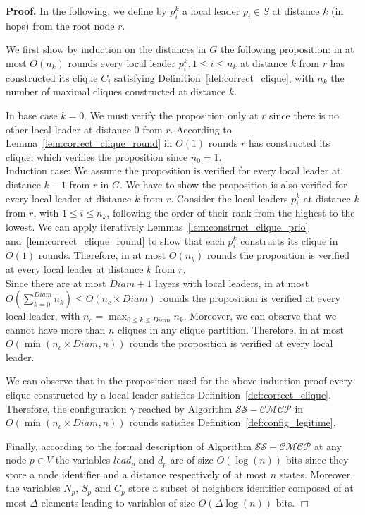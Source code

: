 \documentclass[11pt,letterpaper,onecolumn]{article}
\newenvironment{proof}{\noindent \begin{rm}{\textbf{Proof.} }}{\hspace*{\fill}$\Box$\par\end{rm} \vspace{.3cm}}
\begin{document}
\begin{proof}
In the following, we define by $p_i^k$ a local leader $p_i \in \overline{S}$ at distance $k$ (in hops) from the root node $r$.

We first show by induction on the distances in $G$ the following proposition: in at most $O(n_k)$ rounds every local leader $p_i^k, 1 \leq i \leq n_k$ at distance $k$ from $r$ has constructed its clique $C_i$ satisfying Definition~\ref{def:correct_clique}, with $n_k$ the number of maximal cliques constructed at distance $k$.

In base case $k=0$. We must verify the proposition only at $r$ since there is no other local leader at distance 0 from $r$. According to Lemma~\ref{lem:correct_clique_round} in $O(1)$ rounds $r$ has constructed its clique, which verifies the proposition since $n_0=1$.\\
Induction case: We assume the proposition is verified for every local leader at distance $k-1$ from $r$ in $G$. We have to show the proposition is also verified for every local leader at distance $k$ from $r$. Consider the local leaders $p_i^k$ at distance $k$ from $r$, with $1 \leq i \leq n_k$, following the order of their rank from the highest to the lowest. We can apply iteratively Lemmas~\ref{lem:construct_clique_prio} and~\ref{lem:correct_clique_round} to show that each $p_i^k$ constructs its clique in $O(1)$ rounds. Therefore, in at most $O(n_k)$ rounds the proposition is verified at every local leader at distance $k$ from $r$.\\
Since there are at most $Diam+1$ layers with local leaders, in at most $O(\sum_{k=0}^{Diam} n_k) \leq O(n_c \times Diam)$ rounds the proposition is verified at every local leader, with $n_c=\max_{0 \leq k \leq Diam} n_k$. Moreover, we can observe that we cannot have more than $n$ cliques in any clique partition. Therefore, in at most $O(\min(n_c \times Diam, n))$ rounds the proposition is verified at every local leader.

We can observe that in the proposition used for the above induction proof every clique constructed by a local leader satisfies Definition~\ref{def:correct_clique}. Therefore, the configuration $\gamma$ reached by Algorithm $\mathcal{SS-CMCP}$ in $O(\min(n_c \times Diam, n))$ rounds satisfies Definition~\ref{def:config_legitime}.

Finally, according to the formal description of Algorithm $\mathcal{SS-CMCP}$ at any node $p \in V$ the variables $lead_p$ and $d_p$ are of size $O(\log(n))$ bits since they store a node identifier and a distance respectively of at most $n$ states. Moreover, the variables $N_p$, $S_p$ and $C_p$ store a subset of neighbors identifier composed of at most $\Delta$ elements leading to variables of size $O(\Delta \log(n))$ bits.
\end{proof}
\end{document}
